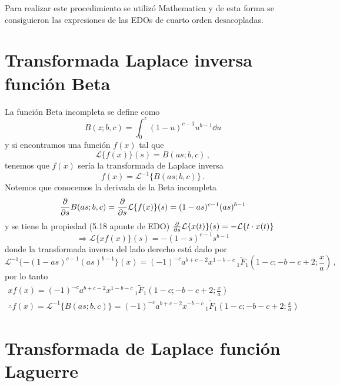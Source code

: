\documentclass[%
 aip,
 jmp,%
 amsmath,amssymb,
 reprint,%
]{revtex4-2}
\begin{document}
{Para realizar este procedimiento se utilizó Mathematica y de esta forma se consiguieron las expresiones de las EDOs de cuarto orden desacopladas.




\section{Transformada Laplace inversa función Beta}

La función Beta incompleta se define como
\begin{equation}\label{eqAp:beta-as-integral}
    B(z;b,c)=\int_0^{z}(1-u)^{c-1}u^{b-1}\dd{u}
\end{equation}
y si encontramos una función $f(x)$ tal que
\begin{equation}
    \mathcal{L}\{f(x)\}(s)=B(as;b,c)\,,
\end{equation}
tenemos que $f(x)$ sería la transformada de Laplace inversa
\begin{equation}
    f(x)=\mathcal{L}^{-1}\{B(as;b,c)\}\,.
\end{equation}
Notemos que conocemos la derivada de la Beta incompleta
\begin{equation}
    \pdv{s}B(as;b,c)=\pdv{s}\mathcal{L}\{f(x)\}(s)=(1-as)^{c-1}(as)^{b-1}
\end{equation}
y se tiene la propiedad (5.18 apunte de EDO) $\pdv{s}\mathcal{L}\{x(t)\}(s)=-\mathcal{L}\{t\cdot x(t)\}$
\begin{equation}
    \Rightarrow \mathcal{L}\{xf(x)\}(s)=-(1-s)^{c-1}s^{b-1}
\end{equation}
donde la transformada inversa del lado derecho está dado por
\begin{equation}
    \mathcal{L}^{-1}\{-(1-as)^{c-1}(as)^{b-1}\}(x)=(-1)^{-c} a^{b+c-2} x^{1 - b-c} \,_1 \tilde{F}_1\left(1 - c;-b - c + 2;\frac{x}{a}\right)\,,
\end{equation}
por lo tanto
\begin{gather}
    xf(x)=(-1)^{-c} a^{b+c-2} x^{1 - b-c} \,_1 \tilde{F}_1\left(1 - c;-b - c + 2;\frac{x}{a}\right)\\
    \therefore f(x)=\mathcal{L}^{-1}\{B(as;b,c)\}=(-1)^{-c} a^{b+c-2} x^{- b - c} \,_1 \tilde{F}_1\left(1 - c;-b - c + 2;\frac{x}{a}\right)\label{eq:beta-incomplete-inverse}
\end{gather}

\section{Transformada de Laplace función Laguerre}

}
\end{document}
